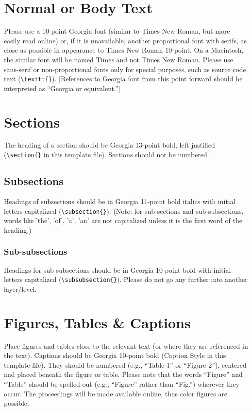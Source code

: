 \documentclass{icis}
\begin{document}
\section{Normal or Body Text}
Please use a 10-point Georgia font (similar to Times New Roman, but more easily
read online) or, if it is unavailable, another proportional font with serifs, as
close as possible in appearance to Times New Roman 10-point. On a Macintosh, the
similar font will be named Times and not Times New Roman. Please use sans-serif
or non-proportional fonts only for special purposes, such as source code text
(\texttt{\textbackslash texttt\{\}}). [References to Georgia font from this
point forward should be interpreted as ``Georgia or equivalent.'']

\section{Sections}
The heading of a section should be Georgia 13-point bold, left justified
(\texttt{\textbackslash section\{\}} in this template file).  Sections should not be numbered.

\subsection{Subsections}
Headings of subsections should be in Georgia 11-point bold italics with initial
letters capitalized (\texttt{\textbackslash subsection\{\}}). (Note: for
sub-sections and sub-subsections, words like 'the', 'of', 'a', 'an' are not
capitalized unless it is the first word of the heading.)

\subsubsection{Sub-subsections}
Headings for sub-subsections should be in Georgia 10-point bold with initial
letters capitalized (\texttt{\textbackslash subsubsection\{\}}). Please do not
go any further into another layer/level.

\section{Figures, Tables \& Captions}
Place figures and tables close to the relevant text (or where they are
referenced in the text).  Captions should be Georgia 10-point bold (Caption
Style in this template file).  They should be numbered (e.g., ``Table 1'' or
``Figure 2''), centered and placed beneath the figure or table.  Please note that
the words ``Figure'' and ``Table'' should be spelled out (e.g., ``Figure'' rather than ``Fig.'') wherever they occur. The proceedings will be made available online, thus color figures are possible.
\end{document}
